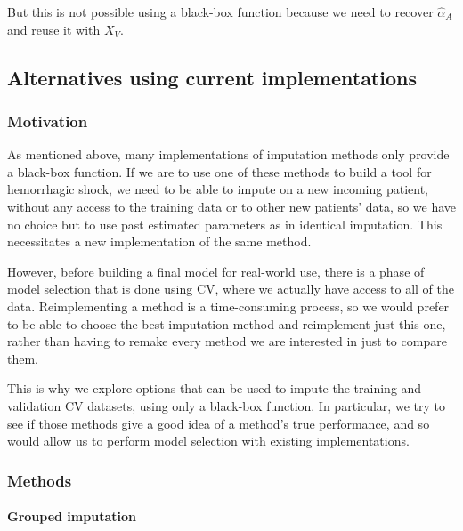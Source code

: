 But this is not possible using a black-box function because we need to recover $\hat{\alpha}_A$ and reuse it with $X_V$.

		\subsection{Alternatives using current implementations}
			\subsubsection{Motivation}
As mentioned above, many implementations of imputation methods only provide a black-box function. If we are to use one of these methods to build a tool for hemorrhagic shock, we need to be able to impute on a new incoming patient, without any access to the training data or to other new patients' data, so we have no choice but to use past estimated parameters as in identical imputation. This necessitates a new implementation of the same method.

However, before building a final model for real-world use, there is a phase of model selection that is done using CV, where we actually have access to all of the data. Reimplementing a method is a time-consuming process, so we would prefer to be able to choose the best imputation method and reimplement just this one, rather than having to remake every method we are interested in just to compare them.

This is why we explore options that can be used to impute the training and validation CV datasets, using only a black-box function. In particular, we try to see if those methods give a good idea of a method's true performance, and so would allow us to perform model selection with existing implementations.

			\subsubsection{Methods}

\paragraph{Grouped imputation} 

